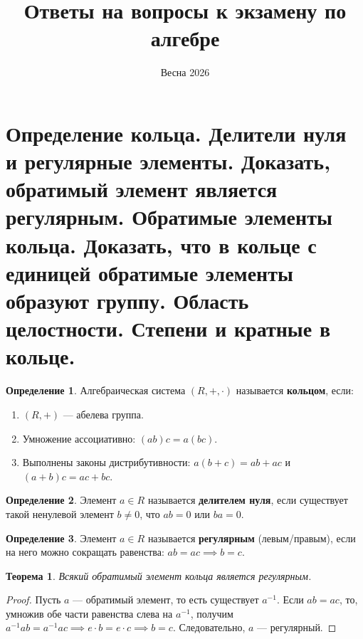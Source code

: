 \documentclass[12pt, a4paper]{article}
\title{\textbf{Ответы на вопросы к экзамену по алгебре}}
\author{Весна 2026}
\date{}
\theoremstyle{definition}
\newtheorem{definition}{Определение}[section]
\theoremstyle{plain}
\newtheorem{theorem}{Теорема}[section]
\begin{document}
	
	\maketitle
	\tableofcontents
	\newpage
	
	\section{Определение кольца. Делители нуля и регулярные элементы. Доказать, обратимый элемент является регулярным. Обратимые элементы кольца. Доказать, что в кольце с единицей обратимые элементы образуют группу. Область целостности. Степени и кратные в кольце.}
	
	\begin{definition}
		Алгебраическая система $(R, +, \cdot)$ называется \textbf{кольцом}, если:
		\begin{enumerate}
			\item $(R, +)$ — абелева группа.
			\item Умножение ассоциативно: $(ab)c = a(bc)$.
			\item Выполнены законы дистрибутивности: $a(b+c) = ab+ac$ и $(a+b)c = ac+bc$.
		\end{enumerate}
	\end{definition}
	
	\begin{definition}
		Элемент $a \in R$ называется \textbf{делителем нуля}, если существует такой ненулевой элемент $b \neq 0$, что $ab=0$ или $ba=0$.
	\end{definition}
	
	\begin{definition}
		Элемент $a \in R$ называется \textbf{регулярным} (левым/правым), если на него можно сокращать равенства: $ab=ac \implies b=c$.
	\end{definition}
	
	\begin{theorem}
		Всякий обратимый элемент кольца является регулярным.
	\end{theorem}
	\begin{proof}
		Пусть $a$ — обратимый элемент, то есть существует $a^{-1}$. Если $ab = ac$, то, умножив обе части равенства слева на $a^{-1}$, получим $a^{-1}ab = a^{-1}ac \implies e \cdot b = e \cdot c \implies b = c$. Следовательно, $a$ — регулярный.
	\end{proof}
	
\end{document}
